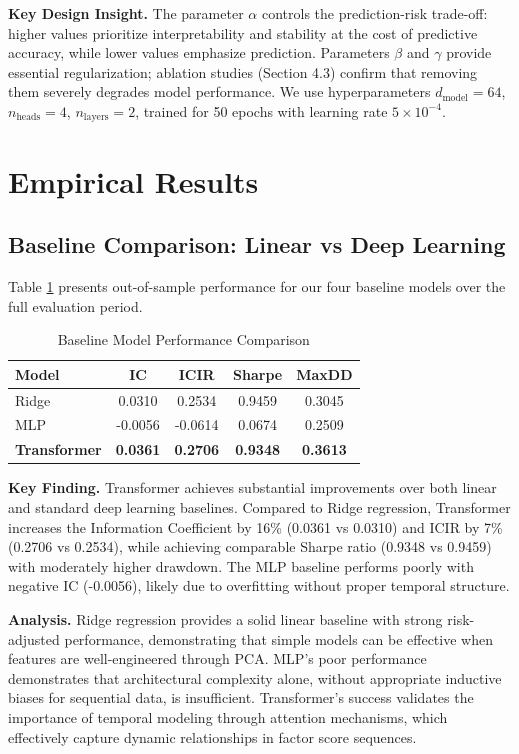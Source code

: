 \documentclass[12pt]{article}
\begin{document}
\textbf{Key Design Insight.} The parameter $\alpha$ controls the prediction-risk trade-off: higher values prioritize interpretability and stability at the cost of predictive accuracy, while lower values emphasize prediction. Parameters $\beta$ and $\gamma$ provide essential regularization; ablation studies (Section 4.3) confirm that removing them severely degrades model performance. We use hyperparameters $d_{\text{model}}=64$, $n_{\text{heads}}=4$, $n_{\text{layers}}=2$, trained for 50 epochs with learning rate $5 \times 10^{-4}$.

\section{Empirical Results}

\subsection{Baseline Comparison: Linear vs Deep Learning}

Table \ref{tab:baseline} presents out-of-sample performance for our four baseline models over the full evaluation period.

\begin{table}[ht!]
\centering
\caption{Baseline Model Performance Comparison}
\label{tab:baseline}
\begin{tabular}{lcccc}
\toprule
\textbf{Model} & \textbf{IC} & \textbf{ICIR} & \textbf{Sharpe} & \textbf{MaxDD} \\
\midrule
Ridge & 0.0310 & 0.2534 & 0.9459 & 0.3045 \\
MLP & -0.0056 & -0.0614 & 0.0674 & 0.2509 \\
\textbf{Transformer} & \textbf{0.0361} & \textbf{0.2706} & \textbf{0.9348} & \textbf{0.3613} \\
\bottomrule
\end{tabular}
\end{table}

\textbf{Key Finding.} Transformer achieves substantial improvements over both linear and standard deep learning baselines. Compared to Ridge regression, Transformer increases the Information Coefficient by 16\% (0.0361 vs 0.0310) and ICIR by 7\% (0.2706 vs 0.2534), while achieving comparable Sharpe ratio (0.9348 vs 0.9459) with moderately higher drawdown. The MLP baseline performs poorly with negative IC (-0.0056), likely due to overfitting without proper temporal structure.

\textbf{Analysis.} Ridge regression provides a solid linear baseline with strong risk-adjusted performance, demonstrating that simple models can be effective when features are well-engineered through PCA. MLP's poor performance demonstrates that architectural complexity alone, without appropriate inductive biases for sequential data, is insufficient. Transformer's success validates the importance of temporal modeling through attention mechanisms, which effectively capture dynamic relationships in factor score sequences.
\end{document}
